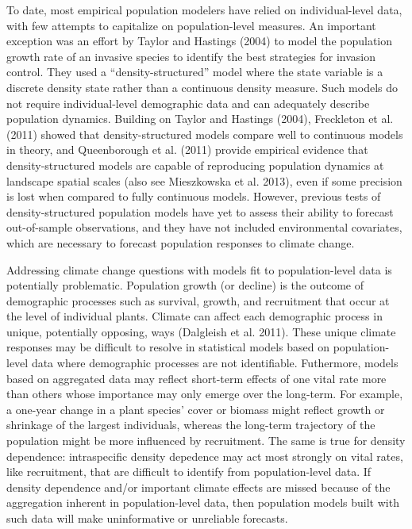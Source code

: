 \documentclass[12pt,]{article}
\begin{document}
To date, most empirical population modelers have relied on
individual-level data, with few attempts to capitalize on
population-level measures. An important exception was an effort by
Taylor and Hastings (2004) to model the population growth rate of an
invasive species to identify the best strategies for invasion control.
They used a ``density-structured'' model where the state variable is a
discrete density state rather than a continuous density measure. Such
models do not require individual-level demographic data and can
adequately describe population dynamics. Building on Taylor and Hastings
(2004), Freckleton et al. (2011) showed that density-structured models
compare well to continuous models in theory, and Queenborough et al.
(2011) provide empirical evidence that density-structured models are
capable of reproducing population dynamics at landscape spatial scales
(also see Mieszkowska et al. 2013), even if some precision is lost when
compared to fully continuous models. However, previous tests of
density-structured population models have yet to assess their ability to
forecast out-of-sample observations, and they have not included
environmental covariates, which are necessary to forecast population
responses to climate change.

Addressing climate change questions with models fit to population-level
data is potentially problematic. Population growth (or decline) is the
outcome of demographic processes such as survival, growth, and
recruitment that occur at the level of individual plants. Climate can
affect each demographic process in unique, potentially opposing, ways
(Dalgleish et al. 2011). These unique climate responses may be difficult
to resolve in statistical models based on population-level data where
demographic processes are not identifiable. Futhermore, models based on
aggregated data may reflect short-term effects of one vital rate more
than others whose importance may only emerge over the long-term. For
example, a one-year change in a plant species' cover or biomass might
reflect growth or shrinkage of the largest individuals, whereas the
long-term trajectory of the population might be more influenced by
recruitment. The same is true for density dependence: intraspecific
density depedence may act most strongly on vital rates, like
recruitment, that are difficult to identify from population-level data.
If density dependence and/or important climate effects are missed
because of the aggregation inherent in population-level data, then
population models built with such data will make uninformative or
unreliable forecasts.
\end{document}
